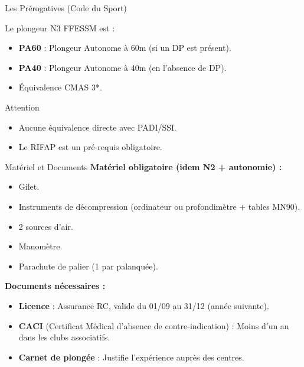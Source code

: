 \begin{frame}{Les Prérogatives (Code du Sport)}
    \begin{block}{Le plongeur N3 FFESSM est :}
        \begin{itemize}
            \item \textbf{PA60} : Plongeur Autonome à 60m (si un DP est présent).
            \item \textbf{PA40} : Plongeur Autonome à 40m (en l'absence de DP).
            \item Équivalence CMAS 3*.
        \end{itemize}
    \end{block}

    \begin{alertblock}{Attention}
        \begin{itemize}
            \item Aucune équivalence directe avec PADI/SSI.
            \item Le RIFAP est un pré-requis obligatoire.
        \end{itemize}
    \end{alertblock}
\end{frame}

\begin{frame}{Matériel et Documents}
    \textbf{Matériel obligatoire (idem N2 + autonomie) :}
    \begin{itemize}
        \item Gilet.
        \item Instruments de décompression (ordinateur ou profondimètre + tables MN90).
        \item 2 sources d'air.
        \item Manomètre.
        \item Parachute de palier (1 par palanquée).
    \end{itemize}

    \vspace{0.5cm}
    \textbf{Documents nécessaires :}
    \begin{itemize}
        \item \textbf{Licence} : Assurance RC, valide du 01/09 au 31/12 (année suivante).
        \item \textbf{CACI} (Certificat Médical d'absence de contre-indication) : Moins d'un an dans les clubs associatifs.
        \item \textbf{Carnet de plongée} : Justifie l'expérience auprès des centres.
    \end{itemize}
\end{frame}

